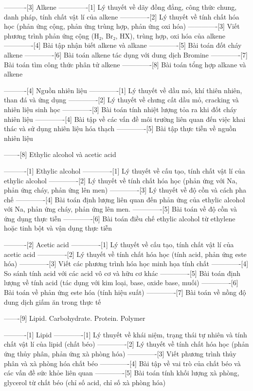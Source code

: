 ----------[3] Alkene
-------------[1] Lý thuyết về dãy đồng đẳng, công thức chung, danh pháp, tính chất vật lí của alkene
-------------[2] Lý thuyết về tính chất hóa học (phản ứng cộng, phản ứng trùng hợp, phản ứng oxi hóa)
-------------[3] Viết phương trình phản ứng cộng (H₂, Br₂, HX), trùng hợp, oxi hóa của alkene
-------------[4] Bài tập nhận biết alkene và alkane
-------------[5] Bài toán đốt cháy alkene
-------------[6] Bài toán alkene tác dụng với dung dịch Bromine
-------------[7] Bài toán tìm công thức phân tử alkene
-------------[8] Bài toán tổng hợp alkane và alkene

----------[4] Nguồn nhiên liệu
-------------[1] Lý thuyết về dầu mỏ, khí thiên nhiên, than đá và ứng dụng
-------------[2] Lý thuyết về chưng cất dầu mỏ, cracking và nhiên liệu sinh học
-------------[3] Bài toán tính nhiệt lượng tỏa ra khi đốt cháy nhiên liệu
-------------[4] Bài tập về các vấn đề môi trường liên quan đến việc khai thác và sử dụng nhiên liệu hóa thạch
-------------[5] Bài tập thực tiễn về nguồn nhiên liệu

-------[8] Ethylic alcohol và acetic acid

----------[1] Ethylic alcohol
-------------[1] Lý thuyết về cấu tạo, tính chất vật lí của ethylic alcohol
-------------[2] Lý thuyết về tính chất hóa học (phản ứng với Na, phản ứng cháy, phản ứng lên men)
-------------[3] Lý thuyết về độ cồn và cách pha chế
-------------[4] Bài toán định lượng liên quan đến phản ứng của ethylic alcohol với Na, phản ứng cháy, phản ứng lên men.
-------------[5] Bài toán về độ cồn và ứng dụng thực tiễn
-------------[6] Bài toán điều chế ethylic alcohol từ ethylene hoặc tinh bột và vận dụng thực tiễn

----------[2] Acetic acid
-------------[1] Lý thuyết về cấu tạo, tính chất vật lí của acetic acid
-------------[2] Lý thuyết về tính chất hóa học (tính acid, phản ứng este hóa)
-------------[3] Viết các phương trình hóa học minh họa tính chất
-------------[4] So sánh tính acid với các acid vô cơ và hữu cơ khác
-------------[5] Bài toán định lượng về tính acid (tác dụng với kim loại, base, oxide base, muối)
-------------[6] Bài toán về phản ứng este hóa (tính hiệu suất)
-------------[7] Bài toán về nồng độ dung dịch giấm ăn trong thực tế

-------[9] Lipid. Carbohydrate. Protein. Polymer

----------[1] Lipid
-------------[1] Lý thuyết về khái niệm, trạng thái tự nhiên và tính chất vật lí của lipid (chất béo)
-------------[2] Lý thuyết về tính chất hóa học (phản ứng thủy phân, phản ứng xà phòng hóa)
-------------[3] Viết phương trình thủy phân và xà phòng hóa chất béo
-------------[4] Bài tập về vai trò của chất béo và các vấn đề sức khỏe liên quan
-------------[5] Bài toán tính khối lượng xà phòng, glycerol từ chất béo (chỉ số acid, chỉ số xà phòng hóa)

